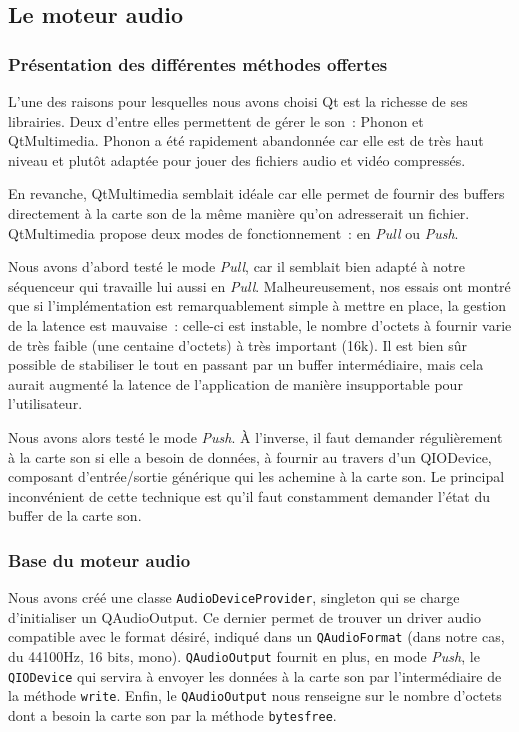 \subsection{Le moteur audio}

\subsubsection{Présentation des différentes méthodes offertes}

L'une des raisons pour lesquelles nous avons choisi Qt est la
richesse de ses librairies. Deux d'entre elles permettent de gérer le son~: Phonon et QtMultimedia. Phonon a été rapidement abandonnée car
elle est de très haut niveau et plutôt adaptée pour jouer des
fichiers audio et vidéo compressés.

En revanche, QtMultimedia semblait idéale car elle permet de
fournir des buffers directement à la carte son de la même manière
qu'on adresserait un fichier. QtMultimedia propose deux modes de
fonctionnement~: en \emph{Pull} ou \emph{Push}.

Nous avons d'abord testé le mode \emph{Pull}, car il semblait bien
adapté à notre séquenceur qui travaille lui aussi en \emph{Pull}.
Malheureusement, nos essais ont montré que si l'implémentation est
remarquablement simple à mettre en place, la gestion de la latence
est mauvaise~: celle-ci est instable, le nombre d'octets à fournir
varie de très faible (une centaine d'octets) à très important
(16k). Il est bien sûr possible de stabiliser le tout en passant
par un buffer intermédiaire, mais cela aurait augmenté la latence de
l'application de manière insupportable pour l'utilisateur.

Nous avons alors testé le mode \emph{Push}. À l'inverse, il faut
demander régulièrement à la carte son si elle a besoin de données,
à fournir au travers d'un QIODevice, composant d'entrée/sortie
générique qui les achemine à la carte son. Le principal
inconvénient de cette technique est qu'il faut constamment demander
l'état du buffer de la carte son.

\subsubsection{Base du moteur audio}

Nous avons créé une classe \verb!AudioDeviceProvider!, singleton
qui se charge d'initialiser un QAudioOutput. Ce dernier permet
de trouver un driver audio compatible avec le format désiré,
indiqué dans un \verb!QAudioFormat! (dans notre cas, du 44100Hz, 16
bits, mono). \verb!QAudioOutput! fournit en plus, en mode
\emph{Push}, le \verb!QIODevice! qui servira à envoyer les données
à la carte son par l'intermédiaire de la méthode \verb!write!.
Enfin, le \verb!QAudioOutput! nous renseigne sur le nombre d'octets
dont a besoin la carte son par la méthode \verb!bytesfree!.

